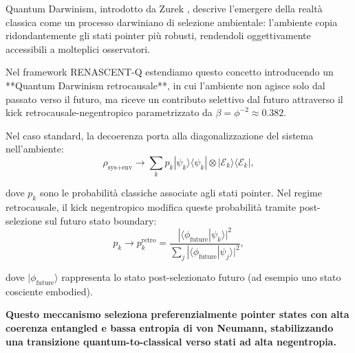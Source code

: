 \documentclass[11pt,a4paper]{article}
\let\oldcite\cite
\renewcommand{\cite}{\protect\oldcite}
\theoremstyle{plain}
\theoremstyle{definition}
\begin{document}
\vspace{0.2cm}

Quantum Darwinism, introdotto da Zurek \cite{zurek_darwinism_2009}, descrive l'emergere della realtà classica come un processo darwiniano di selezione ambientale: l'ambiente copia ridondantemente gli stati pointer più robusti, rendendoli oggettivamente accessibili a molteplici osservatori. 



\vspace{0.3cm}


Nel framework RENASCENT-Q estendiamo questo concetto introducendo un **Quantum Darwinism retrocausale**, in cui l'ambiente non agisce solo dal passato verso il futuro, ma riceve un contributo selettivo dal futuro attraverso il kick retrocausale-negentropico parametrizzato da $\beta = \phi^{-2} \approx 0.382$.




\vspace{0.4cm}

Nel caso standard, la decoerenza porta alla diagonalizzazione del sistema nell'ambiente:
\begin{equation}
\rho_{\text{sys+env}} \to \sum_k p_k |\psi_k\rangle\langle\psi_k| \otimes |\mathcal{E}_k\rangle\langle\mathcal{E}_k|,
\label{eq:darwinism_standard}
\end{equation}


\vspace{0.2cm}
dove $p_k$ sono le probabilità classiche associate agli stati pointer. Nel regime retrocausale, il kick negentropico modifica queste probabilità tramite post-selezione sul futuro stato boundary:
\begin{equation}
p_k \to p_k^{\text{retro}} = \frac{|\langle \phi_{\text{future}} | \psi_k \rangle|^2}{\sum_j |\langle \phi_{\text{future}} | \psi_j \rangle|^2},
\label{eq:darwinism_retro}
\end{equation}


\vspace{0.2cm}
dove $|\phi_{\text{future}}\rangle$ rappresenta lo stato post-selezionato futuro (ad esempio uno stato cosciente embodied). 


\vspace{0.3cm}


\textbf{Questo meccanismo seleziona preferenzialmente pointer states con alta coerenza entangled e bassa entropia di von Neumann, stabilizzando una transizione quantum-to-classical verso stati ad alta negentropia.}
\end{document}
